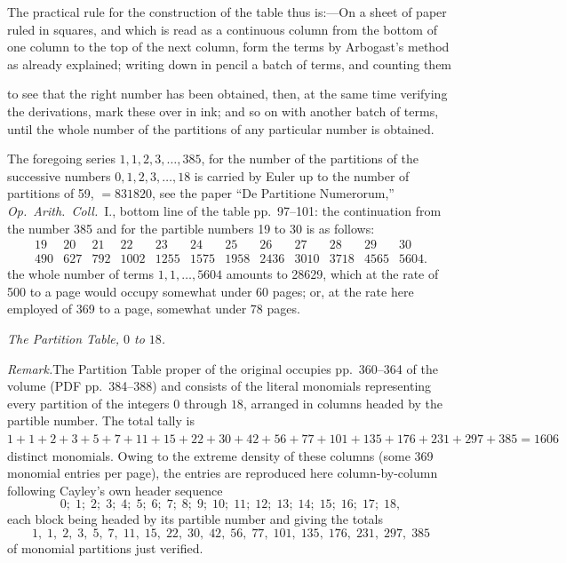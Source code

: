 \documentclass[11pt,a4paper]{article}
\begin{document}
\medskip
The practical rule for the construction of the table thus is:---On a sheet of paper ruled in squares, and which is read as a continuous column from the bottom of one column to the top of the next column, form the terms by Arbogast's method as already explained; writing down in pencil a batch of terms, and counting them

\newpage
\noindent
to see that the right number has been obtained, then, at the same time verifying the derivations, mark these over in ink; and so on with another batch of terms, until the whole number of the partitions of any particular number is obtained.

The foregoing series $1,1,2,3,\ldots,385$, for the number of the partitions of the successive numbers $0,1,2,3,\ldots,18$ is carried by Euler up to the number of partitions of 59, $=831820$, see the paper ``De Partitione Numerorum,'' \textit{Op.\ Arith.\ Coll.}\ I., bottom line of the table pp.\ 97--101: the continuation from the number 385 and for the partible numbers 19 to 30 is as follows:
\[
  \begin{array}{cccccccccccc}
    19  & 20  & 21  & 22  & 23  & 24  & 25  & 26  & 27  & 28  & 29  & 30 \\
    490 & 627 & 792 & 1002 & 1255 & 1575 & 1958 & 2436 & 3010 & 3718 & 4565 & 5604.
  \end{array}
\]
the whole number of terms $1,1,\ldots,5604$ amounts to 28629, which at the rate of 500 to a page would occupy somewhat under 60 pages; or, at the rate here employed of 369 to a page, somewhat under 78 pages.

\bigskip
\begin{center}
\textit{The Partition Table, $0$ to $18$.}
\end{center}

\medskip
\noindent\textit{Remark.}\quad The Partition Table proper of the original
occupies pp.\ 360--364 of the volume (PDF pp.\ 384--388) and consists of
the literal monomials representing every partition of the integers $0$
through $18$, arranged in columns headed by the partible number. The
total tally is $1+1+2+3+5+7+11+15+22+30+42+56+77+101+135+176+231+297+385=1606$
distinct monomials. Owing to the extreme density of these columns
(some 369 monomial entries per page), the entries are reproduced here
column-by-column following Cayley's own header sequence
\[
  0;\;1;\;2;\;3;\;4;\;5;\;6;\;7;\;8;\;9;\;10;\;11;\;12;\;13;\;14;\;15;\;16;\;17;\;18,
\]
each block being headed by its partible number and giving the
totals
\[
  1,\;1,\;2,\;3,\;5,\;7,\;11,\;15,\;22,\;30,\;42,\;56,\;77,\;101,\;135,\;176,\;231,\;297,\;385
\]
of monomial partitions just verified.
\end{document}
